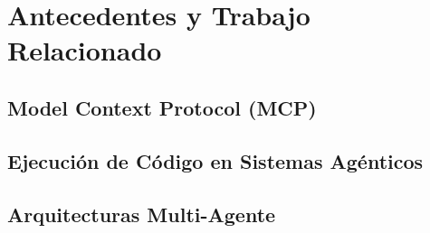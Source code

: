 \documentclass[runningheads]{llncs}
\begin{document}




%
\section{Antecedentes y Trabajo Relacionado}
\label{sec:background}

\subsection{Model Context Protocol (MCP)}
\label{sec:mcp}

\subsection{Ejecuci\'on de C\'odigo en Sistemas Ag\'enticos}
\label{sec:code-exec}

\subsection{Arquitecturas Multi-Agente}
\label{sec:multi-agent}
\end{document}
